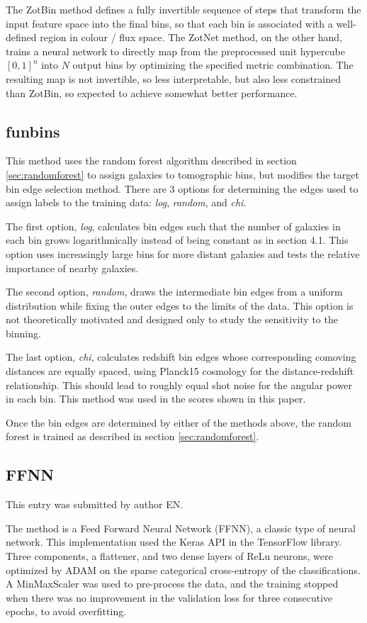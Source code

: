 \documentclass[twocolumn,twocolappendix]{aastex63}
\begin{document}
The ZotBin method defines a fully invertible sequence of steps that transform the input feature space into
the final bins, so that each bin is associated with a well-defined region in colour / flux space. The ZotNet method,
on the other hand, trains a neural network to directly map from the preprocessed unit hypercube $[0,1]^n$ into
$N$ output bins by optimizing the specified metric combination. The resulting map is not invertible, so less
interpretable, but also less constrained than ZotBin, so expected to achieve somewhat better performance.

\subsection{ {\sc funbins} }
This method uses the random forest algorithm described in section \ref{sec:randomforest} to assign galaxies to tomographic bins, but modifies the target bin edge selection method. There are 3 options for determining the edges used to assign labels to the training data: \textit{log}, \textit{random}, and \textit{chi}. 

The first option, \textit{log}, calculates bin edges such that the number of galaxies in each bin grows logarithmically instead of being constant as in section 4.1. This option uses increasingly large bins for more distant galaxies and tests the relative importance of nearby galaxies.

The second option, \textit{random}, draws the intermediate bin edges from a uniform distribution while fixing the outer edges to the limits of the data. This option is not theoretically motivated and designed only to study the sensitivity to the binning. 

The last option, \textit{chi}, calculates redshift bin edges whose corresponding comoving distances are equally spaced, using Planck15 \citep{Planck15} cosmology for the distance-redshift relationship. This should lead to roughly equal shot noise for the angular power in each bin. 
This method was used in the scores shown in this paper.

Once the bin edges are determined by either of the methods above, the random forest is trained as described in section \ref{sec:randomforest}.

\subsection{FFNN}
This entry was submitted by author EN.

The method is a Feed Forward Neural Network (FFNN), a classic type of neural network.
This implementation used the Keras API in the TensorFlow library. Three components, a flattener, and two 
dense layers of ReLu neurons, were optimized by ADAM on the sparse categorical cross-entropy of the classifications.
A MinMaxScaler was used to pre-process the data, and the training stopped when there was no improvement in the  
validation loss for three consecutive epochs, to avoid overfitting.
\end{document}
